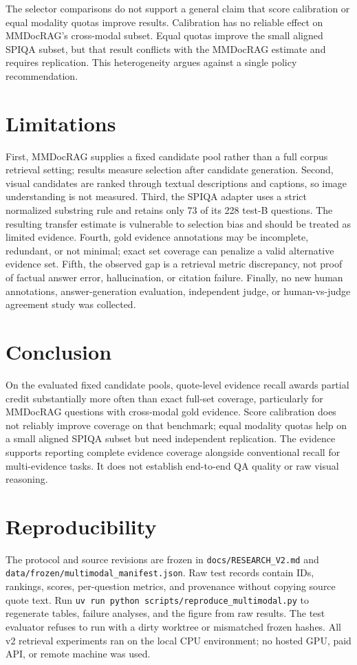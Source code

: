 \documentclass[11pt]{article}
\begin{document}
The selector comparisons do not support a general claim that score calibration or equal modality quotas improve results. Calibration has no reliable effect on MMDocRAG's cross-modal subset. Equal quotas improve the small aligned SPIQA subset, but that result conflicts with the MMDocRAG estimate and requires replication. This heterogeneity argues against a single policy recommendation.

\section{Limitations}
First, MMDocRAG supplies a fixed candidate pool rather than a full corpus retrieval setting; results measure selection after candidate generation. Second, visual candidates are ranked through textual descriptions and captions, so image understanding is not measured. Third, the SPIQA adapter uses a strict normalized substring rule and retains only 73 of its 228 test-B questions. The resulting transfer estimate is vulnerable to selection bias and should be treated as limited evidence. Fourth, gold evidence annotations may be incomplete, redundant, or not minimal; exact set coverage can penalize a valid alternative evidence set. Fifth, the observed gap is a retrieval metric discrepancy, not proof of factual answer error, hallucination, or citation failure. Finally, no new human annotations, answer-generation evaluation, independent judge, or human-vs-judge agreement study was collected.

\section{Conclusion}
On the evaluated fixed candidate pools, quote-level evidence recall awards partial credit substantially more often than exact full-set coverage, particularly for MMDocRAG questions with cross-modal gold evidence. Score calibration does not reliably improve coverage on that benchmark; equal modality quotas help on a small aligned SPIQA subset but need independent replication. The evidence supports reporting complete evidence coverage alongside conventional recall for multi-evidence tasks. It does not establish end-to-end QA quality or raw visual reasoning.

\section{Reproducibility}
The protocol and source revisions are frozen in \texttt{docs/RESEARCH\_V2.md} and \texttt{data/frozen/multimodal\_manifest.json}. Raw test records contain IDs, rankings, scores, per-question metrics, and provenance without copying source quote text. Run \texttt{uv run python scripts/reproduce\_multimodal.py} to regenerate tables, failure analyses, and the figure from raw results. The test evaluator refuses to run with a dirty worktree or mismatched frozen hashes. All v2 retrieval experiments ran on the local CPU environment; no hosted GPU, paid API, or remote machine was used.



\end{document}
